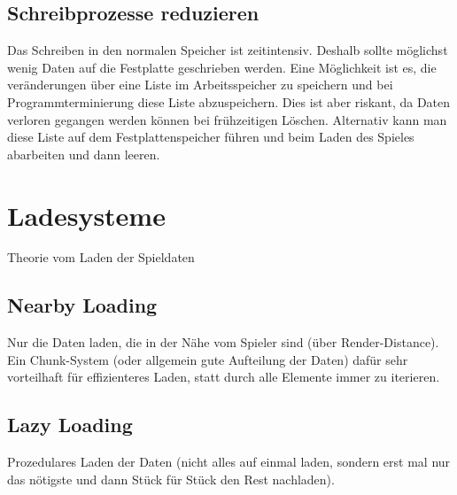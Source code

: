 \subsection{Schreibprozesse reduzieren}
Das Schreiben in den normalen Speicher ist zeitintensiv. Deshalb sollte möglichst wenig Daten auf die Festplatte geschrieben werden. Eine Möglichkeit ist es, die veränderungen über eine Liste im Arbeitsspeicher zu speichern und bei Programmterminierung diese Liste abzuspeichern. Dies ist aber riskant, da Daten verloren gegangen werden können bei frühzeitigen Löschen. Alternativ kann man diese Liste auf dem Festplattenspeicher führen und beim Laden des Spieles abarbeiten und dann leeren.




\section{Ladesysteme}\label{sect:ladesysteme}
Theorie vom Laden der Spieldaten


\subsection{Nearby Loading}
Nur die Daten laden, die in der Nähe vom Spieler sind (über Render-Distance). Ein Chunk-System (oder allgemein gute Aufteilung der Daten) dafür sehr vorteilhaft für effizienteres Laden, statt durch alle Elemente immer zu iterieren.


\subsection{Lazy Loading}
Prozedulares Laden der Daten (nicht alles auf einmal laden, sondern erst mal nur das nötigste und dann Stück für Stück den Rest nachladen). 


